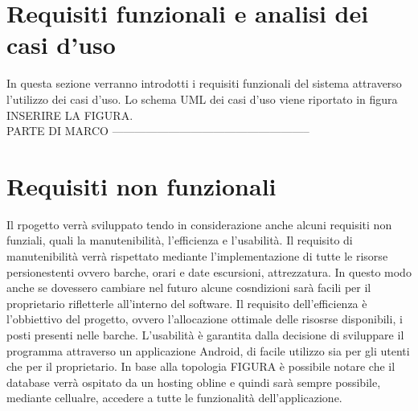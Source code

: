 \section{Requisiti funzionali e analisi dei casi d'uso}
In questa sezione verranno introdotti i requisiti funzionali del sistema attraverso l'utilizzo dei casi d'uso. Lo schema UML dei casi d'uso viene riportato in figura INSERIRE LA FIGURA. 
\\
PARTE DI MARCO -----------------------------------------------------
\\

\section{Requisiti non funzionali}
Il rpogetto verrà sviluppato tendo in considerazione anche alcuni requisiti non funziali, quali la manutenibilità, l'efficienza e l'usabilità. 
Il requisito di manutenibilità verrà rispettato mediante l'implementazione di tutte le risorse persionestenti ovvero barche, orari e date escursioni, attrezzatura. In questo modo anche se dovessero cambiare nel futuro alcune cosndizioni sarà facili per il proprietario rifletterle all'interno del software.
Il requisito dell'efficienza è l'obbiettivo del progetto, ovvero l'allocazione ottimale delle risosrse disponibili, i posti presenti nelle barche. 
L'usabilità è garantita dalla decisione di sviluppare il programma attraverso un applicazione Android, di facile utilizzo sia per gli utenti che per il proprietario. In base alla topologia FIGURA è possibile notare che il database verrà ospitato da un hosting obline e quindi sarà sempre possibile, mediante cellualre, accedere a tutte le funzionalità dell'applicazione. 